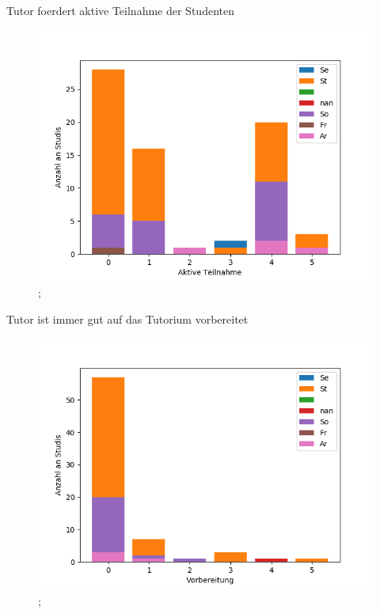 \documentclass[10pt]{beamer}
\begin{document}
\begin{frame}[fragile]{Tutor foerdert aktive Teilnahme der Studenten} 
 \begin{figure}
 \includegraphics[width= 0.9\linewidth]{./PDFcreater/Plots/SolidEdge/Tutor+foerdert+aktive+Teilnahme+der+Studenten.png};
 \end{figure}
 \end{frame}
\begin{frame}[fragile]{Tutor ist immer gut auf das Tutorium vorbereitet} 
 \begin{figure}
 \includegraphics[width= 0.9\linewidth]{./PDFcreater/Plots/SolidEdge/Tutor+ist+immer+gut+auf+das+Tutorium+vorbereitet.png};
 \end{figure}
 \end{frame}
\end{document}
